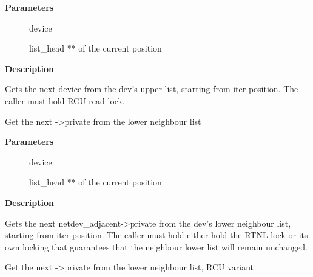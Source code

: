 \documentclass[a4paper,8pt,english]{sphinxmanual}
\begin{document}
\textbf{Parameters}
\begin{description}
\item[{}] \leavevmode
device

\item[{}] \leavevmode
list\_head ** of the current position

\end{description}

\textbf{Description}

Gets the next device from the dev's upper list, starting from iter
position. The caller must hold RCU read lock.

\begin{fulllineitems}
\label{networking/kapi:c.netdev_lower_get_next_private}
Get the next -\textgreater{}private from the lower neighbour list

\end{fulllineitems}


\textbf{Parameters}
\begin{description}
\item[{}] \leavevmode
device

\item[{}] \leavevmode
list\_head ** of the current position

\end{description}

\textbf{Description}

Gets the next netdev\_adjacent-\textgreater{}private from the dev's lower neighbour
list, starting from iter position. The caller must hold either hold the
RTNL lock or its own locking that guarantees that the neighbour lower
list will remain unchanged.

\begin{fulllineitems}
\label{networking/kapi:c.netdev_lower_get_next_private_rcu}
Get the next -\textgreater{}private from the lower neighbour list, RCU variant

\end{fulllineitems}
\end{document}
